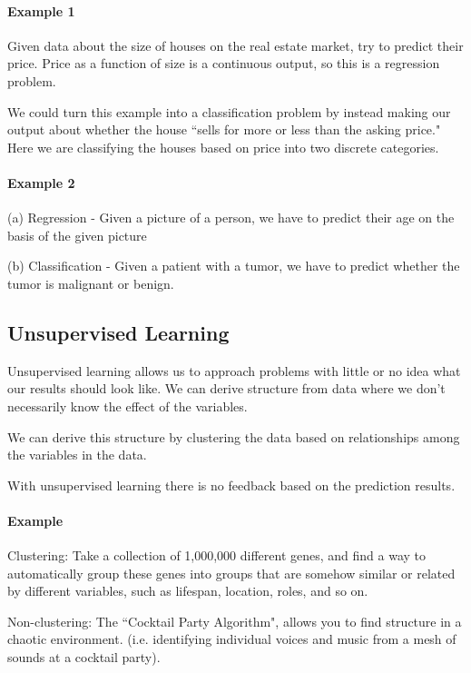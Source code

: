 \documentclass[UTF8]{article}
\begin{document}
\paragraph{Example 1}  

Given data about the size of houses on the real estate market, try to predict their price. Price as a function of size is a continuous output, so this is a regression problem.

We could turn this example into a classification problem by instead making our output about whether the house ``sells for more or less than the asking price." Here we are classifying the houses based on price into two discrete categories.

\paragraph{Example 2}  

(a) Regression - Given a picture of a person, we have to predict their age on the basis of the given picture

(b) Classification - Given a patient with a tumor, we have to predict whether the tumor is malignant or benign.

\subsection{Unsupervised Learning}

Unsupervised learning allows us to approach problems with little or no idea what our results should look like. We can derive structure from data where we don't necessarily know the effect of the variables.

We can derive this structure by clustering the data based on relationships among the variables in the data.

With unsupervised learning there is no feedback based on the prediction results.

\paragraph{Example}

Clustering: Take a collection of 1,000,000 different genes, and find a way to automatically group these genes into groups that are somehow similar or related by different variables, such as lifespan, location, roles, and so on.

Non-clustering: The ``Cocktail Party Algorithm", allows you to find structure in a chaotic environment. (i.e. identifying individual voices and music from a mesh of sounds at a cocktail party).
\end{document}
